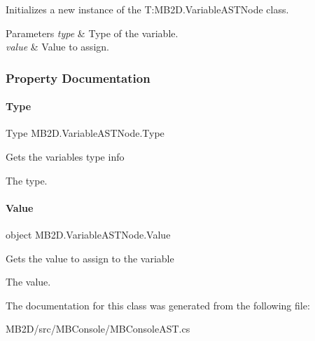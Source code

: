 Initializes a new instance of the T\+:\+M\+B2\+D.\+Variable\+A\+S\+T\+Node class. 


\begin{DoxyParams}{Parameters}
{\em type} & Type of the variable.\\
\hline
{\em value} & Value to assign.\\
\hline
\end{DoxyParams}


\subsubsection{Property Documentation}
\hypertarget{class_m_b2_d_1_1_variable_a_s_t_node_a32549a5361b7664b945b4d9537a5b454}{}\label{class_m_b2_d_1_1_variable_a_s_t_node_a32549a5361b7664b945b4d9537a5b454} 
\paragraph{\texorpdfstring{Type}{Type}}
{\footnotesize\ttfamily Type M\+B2\+D.\+Variable\+A\+S\+T\+Node.\+Type\hspace{0.3cm}{\ttfamily [get]}}



Gets the variables type info 

The type.\hypertarget{class_m_b2_d_1_1_variable_a_s_t_node_ac96eab1a60b3cfab45a718ff87473a4f}{}\label{class_m_b2_d_1_1_variable_a_s_t_node_ac96eab1a60b3cfab45a718ff87473a4f} 
\paragraph{\texorpdfstring{Value}{Value}}
{\footnotesize\ttfamily object M\+B2\+D.\+Variable\+A\+S\+T\+Node.\+Value\hspace{0.3cm}{\ttfamily [get]}}



Gets the value to assign to the variable 

The value.

The documentation for this class was generated from the following file\+:\begin{DoxyCompactItemize}
\item 
M\+B2\+D/src/\+M\+B\+Console/M\+B\+Console\+A\+S\+T.\+cs\end{DoxyCompactItemize}
